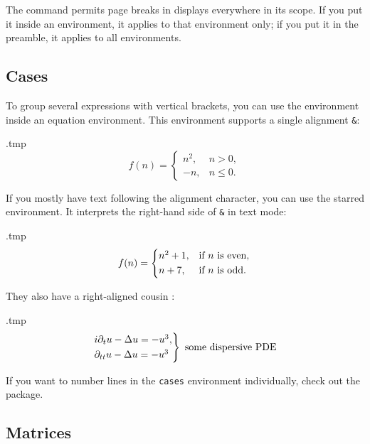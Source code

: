 The  command permits page breaks in displays everywhere in its scope.
If you put it inside an environment, it applies to that environment only;
if you put it in the preamble, it applies to all environments.


%
%
\subsection{Cases}

To group several expressions with vertical brackets,
you can use the  environment inside an equation environment.
This environment supports a single alignment \verb|&|:
%
\begin{VerbatimOut}{\jobname.tmp}
\begin{equation}
f(n) = \begin{cases}
    n^2, & n > 0,\\
    -n, & n \leq 0.
\end{cases}
\end{equation}
\end{VerbatimOut}
\ShowExample
%
If you mostly have text following the alignment character,
you can use the starred environment.
It interprets the right-hand side of \verb|&| in text mode:
%
\begin{VerbatimOut}{\jobname.tmp}
\begin{equation}
f(n) = \begin{cases*}
    n^2+1, & if $n$ is even,\\
    n+7, & if $n$ is odd.
\end{cases*}
\end{equation}
\end{VerbatimOut}
\ShowExample

They also have a right-aligned cousin :
%
\begin{VerbatimOut}{\jobname.tmp}
\begin{equation}
\begin{rcases}
i \partial_t u - \Delta u = -u^3,\\
\partial_{tt} u - \Delta u = -u^3
\end{rcases}
\text{ some dispersive PDE}
\end{equation}
\end{VerbatimOut}
\ShowExampleBelow

If you want to number lines in the \verb|cases| environment individually,
check out the  package.


%
%
\subsection{Matrices}

